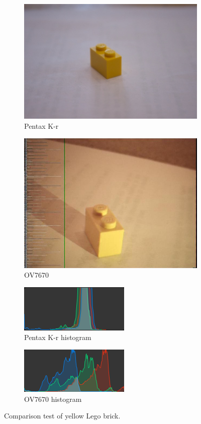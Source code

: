 \begin{figure}
\centering
\begin{subfigure}{.5\textwidth}
  \centering
  \includegraphics[width=.4\linewidth]{./img/pentax_lego.jpg}
  \caption{Pentax K-r}
\end{subfigure}%
\begin{subfigure}{.5\textwidth}
  \centering
  \includegraphics[width=.4\linewidth]{./img/ov7670_lego.jpg}
  \caption{OV7670}
\end{subfigure}
\begin{subfigure}{.5\textwidth}
  \centering
  \includegraphics[width=.4\linewidth]{./img/pentax_lego_histogram.png}
  \caption{Pentax K-r histogram}
\end{subfigure}%
\begin{subfigure}{.5\textwidth}
  \centering
  \includegraphics[width=.4\linewidth]{./img/ov7670_lego_histogram.png}
  \caption{OV7670 histogram}
\end{subfigure}
\label{fig:lego_capture}
\caption{Comparison test of yellow Lego brick.}
\end{figure}


